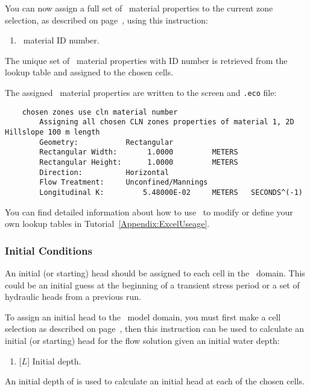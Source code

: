 You can now assign a full set of \cln\ material properties to the current zone selection, as described on page~\pageref{page:zoneSelect}, using this instruction:

    {
        \squish
        \begin{enumerate}
        \item {}  \cln\ material ID number.
        \end{enumerate}
        The unique set of \cln\ material properties with ID number  is retrieved from the lookup table and assigned to the chosen cells.    }

The assigned \cln\ material properties are written to the screen and \texttt{.eco} file:
\begin{verbatim}
    chosen zones use cln material number
    	Assigning all chosen CLN zones properties of material 1, 2D Hillslope 100 m length
    	Geometry:           Rectangular
    	Rectangular Width:       1.0000         METERS
    	Rectangular Height:      1.0000         METERS
    	Direction:          Horizontal
    	Flow Treatment:     Unconfined/Mannings
    	Longitudinal K:         5.48000E-02     METERS   SECONDS^(-1)
\end{verbatim}

You can find detailed information about how to use \dbase\ to modify or define your own lookup tables in Tutorial~\ref{Appendix:ExcelUseage}.

\subsubsection{Initial Conditions}  
An initial (or starting) head should be assigned to each cell in the \cln\ domain.  This could be an initial guess at the beginning of a transient stress period or a set of hydraulic heads from a previous run.

To assign an initial head to the \cln\ model domain, you must first make a cell selection as described on page~\pageref{page:cellSelect}, then this instruction can be used to calculate an initial (or starting) head for the flow solution given an initial water depth:

    {
        \squish
        \begin{enumerate}
        \item {} [$L$]  Initial depth.
        \end{enumerate}
          An initial depth of  is used to calculate an initial head at each of the chosen cells.
    }

